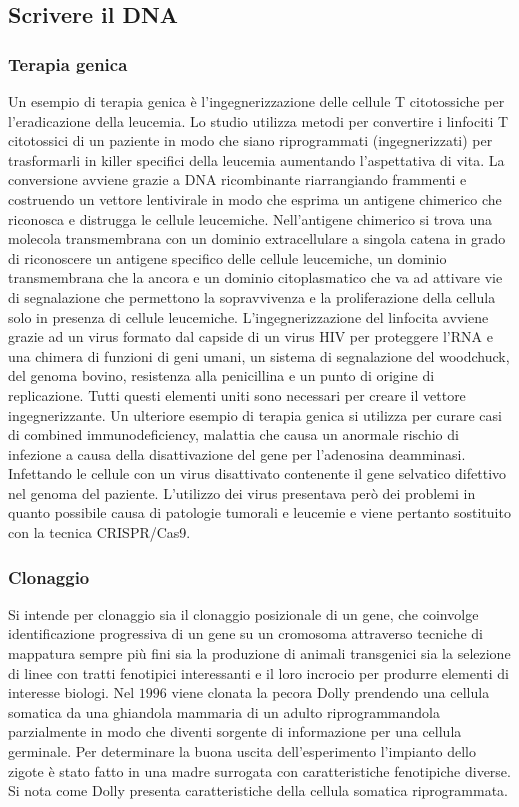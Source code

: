 \subsection{Scrivere il DNA}
\subsubsection{Terapia genica}
Un esempio di terapia genica \`e l'ingegnerizzazione delle cellule T citotossiche per l'eradicazione della leucemia. Lo studio utilizza metodi per convertire i linfociti T citotossici
di un paziente in modo che siano riprogrammati (ingegnerizzati) per trasformarli in killer specifici della leucemia aumentando l'aspettativa di vita. La conversione avviene grazie a 
DNA ricombinante riarrangiando frammenti e costruendo un vettore lentivirale in modo che esprima un antigene chimerico che riconosca e distrugga le cellule leucemiche. Nell'antigene
chimerico si trova una molecola transmembrana con un dominio extracellulare a singola catena in grado di riconoscere un antigene specifico delle cellule leucemiche, un dominio 
transmembrana che la ancora e un dominio citoplasmatico che va ad attivare vie di segnalazione che permettono la sopravvivenza e la proliferazione della cellula solo in presenza di 
cellule leucemiche. L'ingegnerizzazione del linfocita avviene grazie ad un virus formato dal capside di un virus HIV per proteggere l'RNA e una chimera di funzioni di geni umani, un
sistema di segnalazione del woodchuck, del genoma bovino, resistenza alla penicillina e un punto di origine di replicazione. Tutti questi elementi uniti sono necessari per creare il
vettore ingegnerizzante. Un ulteriore esempio di terapia genica si utilizza per curare casi di combined immunodeficiency, malattia che causa un anormale rischio di infezione a causa
della disattivazione del gene per l'adenosina deamminasi. Infettando le cellule con un virus disattivato contenente il gene selvatico difettivo nel genoma del paziente. L'utilizzo dei
virus presentava per\`o dei problemi in quanto possibile causa di patologie tumorali e leucemie e viene pertanto sostituito con la tecnica CRISPR/Cas9.
\subsubsection{Clonaggio}
Si intende per clonaggio sia il clonaggio posizionale di un gene, che coinvolge identificazione progressiva di un gene su un cromosoma attraverso tecniche di mappatura sempre pi\`u fini
sia la produzione di animali transgenici sia la selezione di linee con tratti fenotipici interessanti e il loro incrocio per produrre elementi di interesse biologi. Nel $1996$ viene
clonata la pecora Dolly prendendo una cellula somatica da una ghiandola mammaria di un adulto riprogrammandola parzialmente in modo che diventi sorgente di informazione per una cellula
germinale. Per determinare la buona uscita dell'esperimento l'impianto dello zigote \`e stato fatto in una madre surrogata con caratteristiche fenotipiche diverse. Si nota come Dolly
presenta caratteristiche della cellula somatica riprogrammata. 
